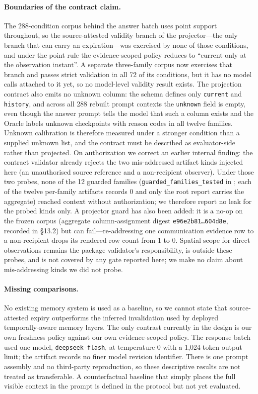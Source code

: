 \documentclass[11pt]{article}
\begin{document}
\paragraph{Boundaries of the contract claim.}
The 288-condition corpus behind the answer batch uses point support throughout, so the source-attested validity branch of the projector---the only branch that can carry an expiration---was exercised by none of those conditions, and under the point rule the evidence-scoped policy reduces to ``current only at the observation instant''. A separate three-family corpus now exercises that branch and passes strict validation in all 72 of its conditions, but it has no model calls attached to it yet, so no model-level validity result exists. The projection contract also emits no unknown column: the schema defines only \texttt{current} and \texttt{history}, and across all 288 rebuilt prompt contexts the \texttt{unknown} field is empty, even though the answer prompt tells the model that such a column exists and the Oracle labels unknown checkpoints with reason codes in all twelve families. Unknown calibration is therefore measured under a stronger condition than a supplied unknown list, and the contract must be described as evaluator-side rather than projected. On authorization we correct an earlier internal finding: the contract validator already rejects the two mis-addressed artifact kinds injected here (an unauthorised source reference and a non-recipient observer). Under those two probes, none of the 12 guarded families (\texttt{guarded\_families\_tested} in ; each of the twelve per-family artifacts records 0 and only the root report carries the aggregate) reached context without authorization; we therefore report no leak for the probed kinds only. A projector guard has also been added: it is a no-op on the frozen corpus (aggregate column-assignment digest \texttt{e96e2b81\ldots604d8e}, recorded in  \S13.2) but can fail—re-addressing one communication evidence row to a non-recipient drops its rendered row count from 1 to 0. Spatial scope for direct observations remains the package validator's responsibility, is outside these probes, and is not covered by any gate reported here; we make no claim about mis-addressing kinds we did not probe.

\paragraph{Missing comparisons.}
No existing memory system is used as a baseline, so we cannot state that source-attested expiry outperforms the inferred invalidation used by deployed temporally-aware memory layers. The only contrast currently in the design is our own freshness policy against our own evidence-scoped policy. The response batch used one model, \texttt{deepseek-flash}, at temperature 0 with a 1,024-token output limit; the artifact records no finer model revision identifier. There is one prompt assembly and no third-party reproduction, so these descriptive results are not treated as transferable. A counterfactual baseline that simply places the full visible context in the prompt is defined in the protocol but not yet evaluated.
\end{document}

